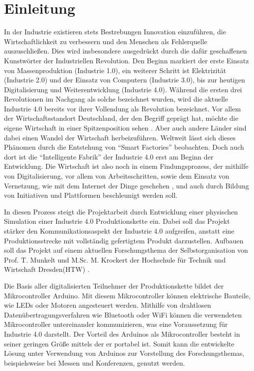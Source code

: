 \chapter{Einleitung}



In der Industrie existieren stets Bestrebungen Innovation einzuführen, die Wirtschaftlichkeit zu verbessern und den Menschen als Fehlerquelle auszuschließen. Dies wird insbesondere ausgedrückt durch die dafür geschaffenen Kunstwörter der Industriellen Revolution. Den Beginn markiert der erste Einsatz von Massenproduktion (Industrie 1.0), ein weiterer Schritt ist Elektrizität (Industrie 2.0) und der Einsatz von Computern (Industrie 3.0), bis zur heutigen Digitalisierung und Weiterentwicklung (Industrie 4.0)\autocite{industrie}. Während die ersten drei Revolutionen im Nachgang als solche bezeichnet wurden, wird die aktuelle Industrie 4.0 bereits vor ihrer Vollendung als Revolution bezeichnet. Vor allem der Wirtschaftsstandort Deutschland, der den Begriff geprägt hat, möchte die eigene Wirtschaft in einer Spitzenposition sehen \autocite{arbeitsbericht}. Aber auch andere Länder sind dabei einen Wandel der Wirtschaft herbeizuführen. Weltweit lässt sich dieses Phänomen durch die Entstehung von \enquote{Smart Factories} beobachten. Doch auch dort ist die \enquote{Intelligente Fabrik} der Industrie 4.0 erst am Beginn der Entwicklung. Die Wirtschaft ist also noch in einem Findungsprozess, der mithilfe von Digitalisierung, vor allem von Arbeitsschritten, sowie dem Einsatz von Vernetzung, wie mit dem Internet der Dinge geschehen , und auch durch Bildung von Initiativen und Plattformen beschleunigt werden soll.

In diesen Prozess steigt die Projektarbeit durch Entwicklung einer physischen Simulation einer Industrie 4.0 Produktionskette ein. Dabei soll das Projekt stärker den Kommunikationsaspekt der Industrie 4.0 aufgreifen, anstatt eine Produktionsstrecke mit vollständig gefertigtem Produkt darzustellen. Aufbauen soll das Projekt auf einem aktuellen Forschungsthema der Selbstorganisation von Prof. T. Munkelt und M.Sc. M. Krockert der Hochschule für Technik und Wirtschaft Dresden(HTW) \autocite{agents}.

Die Basis aller digitalisierten Teilnehmer der Produktionskette bildet der Mikrocontroller Arduino. Mit diesem Mikrocontroller können elektrische Bauteile, wie LEDs oder Motoren angesteuert werden. Mithilfe von drahtlosen Datenübertragungsverfahren wie Bluetooth oder WiFi können die verwendeten Mikrocontroller untereinander kommunizieren, was eine Voraussetzung für Industrie 4.0 darstellt. Der Vorteil des Arduinos als Mikrocontroller besteht in seiner geringen Größe mittels der er portabel ist. Somit kann die entwickelte Lösung unter Verwendung von Arduinos  zur Vorstellung des Forschungsthemas, beispielsweise bei Messen und Konferenzen, genutzt werden. 